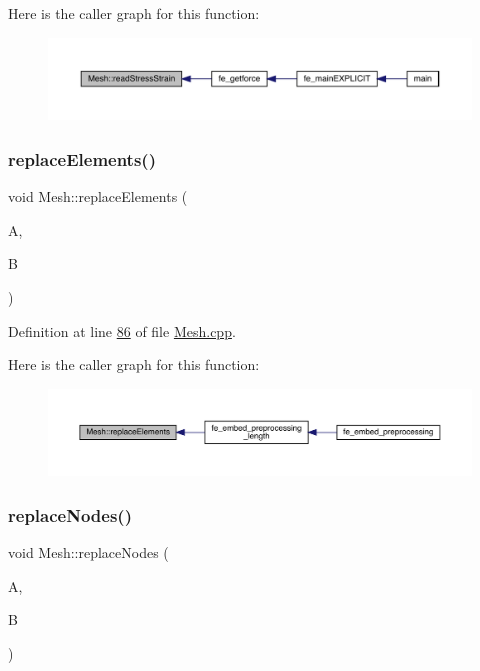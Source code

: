 Here is the caller graph for this function\+:\nopagebreak
\begin{figure}[H]
\begin{center}
\leavevmode
\includegraphics[width=350pt]{class_mesh_a2c1456f1b3b5bda8d213624e3943dbb3_icgraph}
\end{center}
\end{figure}
\mbox{\label{class_mesh_a95ba7a96ec42ea4e0c191890f7faa2ab}} 
\subsubsection{\texorpdfstring{replace\+Elements()}{replaceElements()}}
{\footnotesize\ttfamily void Mesh\+::replace\+Elements (\begin{DoxyParamCaption}\item[{Matrix\+Xi}]{A,  }\item[{std\+::string}]{B }\end{DoxyParamCaption})}



Definition at line \hyperlink{_mesh_8cpp_source_l00086}{86} of file \hyperlink{_mesh_8cpp_source}{Mesh.\+cpp}.

Here is the caller graph for this function\+:\nopagebreak
\begin{figure}[H]
\begin{center}
\leavevmode
\includegraphics[width=350pt]{class_mesh_a95ba7a96ec42ea4e0c191890f7faa2ab_icgraph}
\end{center}
\end{figure}
\mbox{\label{class_mesh_af03b49cbaf762652c9ff5ff7f4a6e668}} 
\subsubsection{\texorpdfstring{replace\+Nodes()}{replaceNodes()}}
{\footnotesize\ttfamily void Mesh\+::replace\+Nodes (\begin{DoxyParamCaption}\item[{Matrix\+Xd}]{A,  }\item[{std\+::string}]{B }\end{DoxyParamCaption})}



